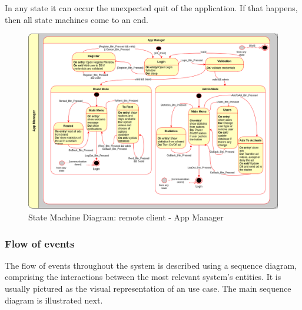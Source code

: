 In any state it can occur the unexpected quit of the application. If that happens, then all state machines come to an end.  

%
\begin{figure}[htb!]
\centering
    \includegraphics[width=0.9\columnwidth]{./img/state-mach-rc-app-manag.png}
  \caption{State Machine Diagram: remote client - App Manager}%
\label{fig:state-mach-rc-app-manag}
\end{figure}
%
%
%

\subsubsection{Flow of events}
\label{sec:flow-events-1}
The flow of events throughout the system is described using a sequence diagram, comprising the interactions between the most relevant system's entities.
It is usually pictured as the visual representation of an use case. The main sequence diagram is illustrated next.

